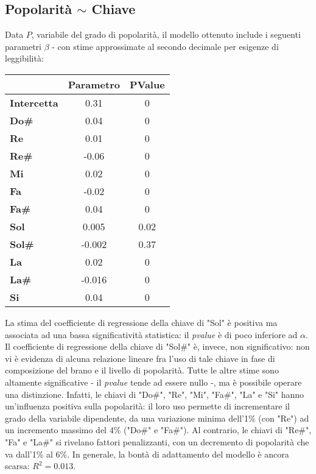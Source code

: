 \documentclass[fleqn,10pt]{SelfArx} %
\begin{document}
\subsection*{Popolarità $\sim$ Chiave}
Data $P$, variabile del grado di popolarità, il modello ottenuto include i seguenti parametri $\beta$ - con stime approssimate al secondo decimale per esigenze di leggibilità:
{\begin{table}[H]
\centering
\begin{tabular}[t]{lcc}
\toprule
&Parametro&PValue\\
\midrule
\textbf{Intercetta}&0.31&0\\
\textbf{Do\#}&0.04&0\\
\textbf{Re}&0.01&0\\
\textbf{Re\#}&-0.06&0\\
\textbf{Mi}&0.02&0\\
\textbf{Fa}&-0.02&0\\
\textbf{Fa\#}&0.04&0\\
\textbf{Sol}&0.005&0.02\\
\textbf{Sol\#}&-0.002&0.37\\
\textbf{La}&0.02&0\\
\textbf{La\#}&-0.016&0\\
\textbf{Si}&0.04&0\\
\bottomrule
\end{tabular}
\end{table}}
La stima del coefficiente di regressione della chiave di "Sol" è positiva ma associata ad una bassa significatività statistica: il \textit{pvalue} è di poco inferiore ad $\alpha$. Il coefficiente di regressione della chiave di "Sol\#" è, invece, non significativo: non vi è evidenza di alcuna relazione lineare fra l'uso di tale chiave in fase di composizione del brano e il livello di popolarità. Tutte le altre stime sono altamente significative - il \textit{pvalue} tende ad essere nullo -, ma è possibile operare una distinzione. Infatti, le chiavi di "Do\#", "Re", "Mi", "Fa\#", "La" e "Si" hanno un'influenza positiva sulla popolarità: il loro uso permette di incrementare il grado della variabile dipendente, da una variazione minima dell'1\% (con "Re") ad un incremento massimo del 4\% ("Do\#" e "Fa\#"). Al contrario, le chiavi di "Re\#", "Fa" e "La\#" si rivelano fattori penalizzanti, con un decremento di popolarità che va dall'1\% al 6\%. In generale, la bontà di adattamento del modello è ancora scarsa: $R^2=0.013$.
\end{document}

